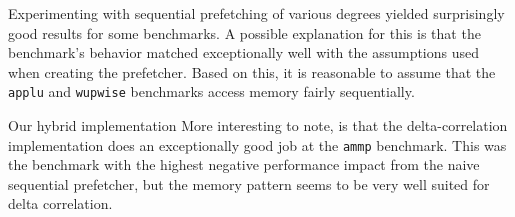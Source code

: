 
Experimenting with sequential prefetching of various degrees yielded surprisingly good results for some benchmarks.
A possible explanation for this is that the benchmark's behavior matched exceptionally well with the assumptions used when creating the prefetcher.
Based on this, it is reasonable to assume that the \texttt{applu} and \texttt{wupwise} benchmarks access memory fairly sequentially.


Our hybrid implementation
More interesting to note, is that the delta-correlation implementation does an exceptionally good job at the \texttt{ammp} benchmark.
This was the benchmark with the highest negative performance impact from the naive sequential prefetcher, but the memory pattern seems to be very well suited for delta correlation.
